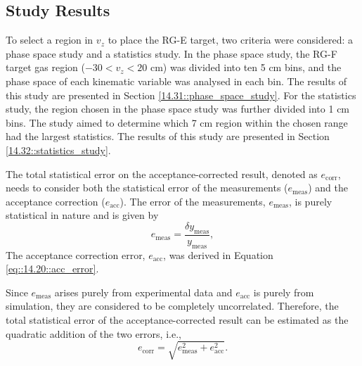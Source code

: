 \subsection{Study Results}
\label{14.30::study_results}
    To select a region in $v_z$ to place the RG-E target, two criteria were considered: a phase space study and a statistics study.
    In the phase space study, the RG-F target gas region ($-30 < v_z < 20$ cm) was divided into ten 5 cm bins, and the phase space of each kinematic variable was analysed in each bin.
    The results of this study are presented in Section \ref{14.31::phase_space_study}.
    For the statistics study, the region chosen in the phase space study was further divided into 1 cm bins.
    The study aimed to determine which 7 cm region within the chosen range had the largest statistics.
    The results of this study are presented in Section \ref{14.32::statistics_study}.

    The total statistical error on the acceptance-corrected result, denoted as $e_\text{corr}$, needs to consider both the statistical error of the measurements ($e_\text{meas}$) and the acceptance correction ($e_\text{acc}$).
    The error of the measurements, $e_\text{meas}$, is purely statistical in nature and is given by
    \begin{equation*}
        e_\text{meas} = \frac{\delta y_\text{meas}}{y_\text{meas}},
    \end{equation*}
    The acceptance correction error, $e_\text{acc}$, was derived in Equation \eqref{eq::14.20::acc_error}.

    Since $e_\text{meas}$ arises purely from experimental data and $e_\text{acc}$ is purely from simulation, they are considered to be completely uncorrelated.
    Therefore, the total statistical error of the acceptance-corrected result can be estimated as the quadratic addition of the two errors, i.e.,
    \begin{equation*}
        e_\text{corr} = \sqrt{e_\text{meas}^2 + e_\text{acc}^2}.
    \end{equation*}

    
    

